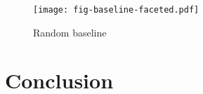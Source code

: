 \documentclass[12pt]{article}
\begin{document}
\begin{figure}[p]
\centering
\texttt{[image: fig-baseline-faceted.pdf]}
\caption{Random baseline}
\label{fig:baseline}
\end{figure}

\section{Conclusion}

\newpage
{}
\sloppy
\printbibliography
\end{document}
